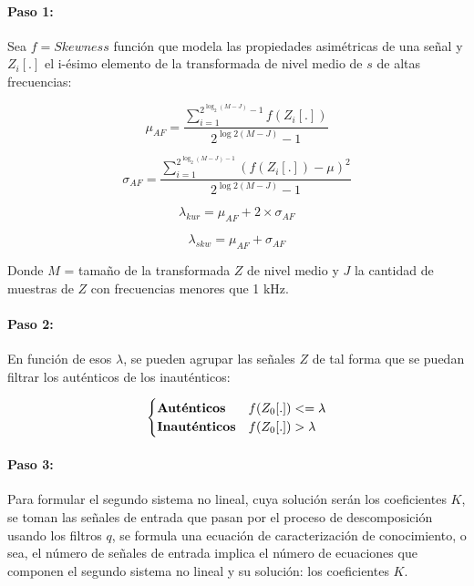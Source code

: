 \documentclass[11pt]{article}
\begin{document}
\paragraph*{Paso 1:}
Sea \(f = Skewness \) función que modela las propiedades asimétricas de una señal y \(Z_{i}[.]\) el i-ésimo elemento de la transformada de nivel medio de \(s\) de altas frecuencias:

\begin{equation}
    \mu_{AF} = \frac{\sum_{i=1}^{2^{\log_{2}(M - J)} - 1} f(Z_{i}[.])}{2^{\log{2}(M - J)} - 1}
\end{equation}

\begin{equation}
    \sigma_{AF} = \frac{\sum_{i=1}^{2^{\log_{2}(M - J) - 1}}(f(Z_{i}[.]) - \mu )^2}{2^{\log{2}(M - J)} - 1}
\end{equation}

\begin{equation}
    \lambda_{kur} = \mu_{AF} + 2 \times \sigma_{AF}
\end{equation}

\begin{equation}
    \lambda_{skw} = \mu_{AF} + \sigma_{AF}
\end{equation}

Donde \(M\) = tamaño de la transformada \(Z\) de nivel medio y \(J\) la cantidad de muestras de \(Z\) con frecuencias menores que 1 kHz.

\paragraph*{Paso 2:}
En función de esos \(\lambda\), se pueden agrupar las señales \(Z\) de tal forma que se puedan filtrar los auténticos de los inauténticos:

\begin{equation}
    \begin{cases}
        {\bf Aut\acute{e}nticos} & \text {\(f(Z_{0}[.]) <= \lambda\)}\\
        {\bf Inaut\acute{e}nticos} & \text{\(f(Z_{0}[.]) > \lambda\)}\\
    \end{cases}
\end{equation}

\paragraph*{Paso 3:}
Para formular el segundo sistema no lineal, cuya solución serán los coeficientes \(K\), se toman las señales de entrada que pasan por el proceso de descomposición usando los filtros \(q\), 
se formula una ecuación de caracterización de conocimiento, o sea, el número de señales de entrada implica el número de ecuaciones que componen el segundo sistema no lineal y su solución: 
los coeficientes \(K\).
\end{document}
